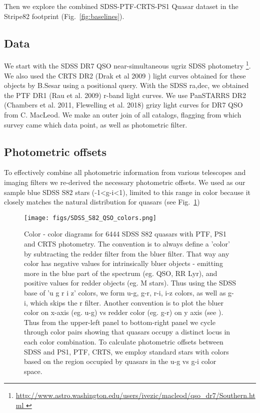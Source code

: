\documentclass[fleqn,usenatbib]{mnras}  %
\begin{document}
Then we explore the combined SDSS-PTF-CRTS-PS1 Quasar dataset in the Stripe82 footprint (Fig.~\ref{fig:baselines}). 

\subsection{Data}
We start with the SDSS DR7 QSO \citep{schneider2007} near-simultaneous ugriz SDSS photometry \footnote{\url{http://www.astro.washington.edu/users/ivezic/macleod/qso_dr7/Southern.html }}. We also used the CRTS DR2 (Drak et al 2009 ) light curves obtained for these objects by  B.Sesar using a positional query. With the SDSS ra,dec, we obtained the PTF DR1 (Rau et al. 2009) r-band light curves. We use PanSTARRS DR2 (Chambers et al. 2011, Flewelling et al. 2018) grizy light curves  for DR7 QSO from C. MacLeod. We make an outer join of all catalogs,  flagging from which survey came which data point, as well as photometric filter. 


\subsection{Photometric offsets}

To effectively combine all photometric information from various telescopes and imaging filters we re-derived the necessary photometric offsets. We used as our sample blue SDSS S82 stars (-1<g-i<1), limited to this range in color because it closely matches the natural distribution for quasars (see Fig.~\ref{fig:quasar_colors})


\begin{figure}
\texttt{[image: figs/SDSS\_S82\_QSO\_colors.png]}
\caption{Color - color diagrams for 6444 SDSS S82 quasars with PTF, PS1 and CRTS photometry. The convention is to always define a 'color' by subtracting the redder filter from the bluer filter. That way any color has negative values for intrinsically bluer objects - emitting more in the blue part of the spectrum (eg. QSO, RR Lyr), and positive values for redder objects (eg. M stars). Thus using the SDSS base of 'u g r i z' colors,  we form u-g, g-r,  r-i, i-z  colors, as well as g-i, which skips the r filter. Another convention is to plot the bluer color on x-axis (eg. u-g) vs redder color (eg. g-r) on y axis (see \citealt{ivezic2002,sesar2007}). Thus from the upper-left panel to bottom-right panel we cycle through color pairs showing that quasars occupy a distinct locus in each color combination. To calculate photometric offsets between SDSS and PS1, PTF, CRTS, we employ standard stars with colors based on the region occupied by quasars in the u-g vs g-i color space. }
\label{fig:quasar_colors}
\end{figure} 
\end{document}

